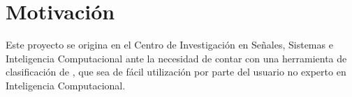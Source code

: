 %
%
%
\section{Motivación}
%
Este proyecto se origina en el Centro de Investigación en Señales, 
Sistemas e Inteligencia Computacional  ante la necesidad de
contar con  una herramienta de clasificación de , que sea
de fácil utilización por parte del usuario no experto en Inteligencia
Computacional.

